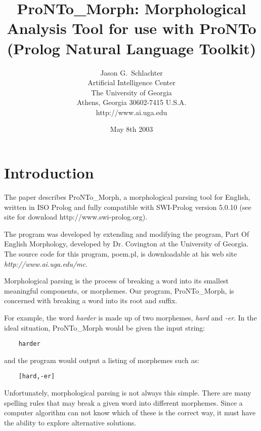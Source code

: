 \title{ProNTo\_Morph: Morphological Analysis Tool for use with ProNTo (Prolog Natural Language Toolkit)}
\author{Jason G.\ Schlachter\\
        Artificial Intelligence Center\\
        The University of Georgia \\
        Athens, Georgia 30602-7415 U.S.A.\\
        http://www.ai.uga.edu \\
        }

\date{May 8th 2003}

\maketitle




\section{Introduction}

The paper describes ProNTo\_Morph, a morphological parsing tool
for English, written in ISO Prolog and fully compatible with
SWI-Prolog version 5.0.10 (see site for download
http://www.swi-prolog.org).\newline

The program was developed by extending and modifying the program,
Part Of English Morphology, developed by Dr. Covington at the
University of Georgia.  The source code for this program, poem.pl,
is downloadable at his web site
\emph{http://www.ai.uga.edu/mc}.\newline

Morphological parsing is the process of breaking a word into its
smallest meaningful components, or morphemes. Our program,
ProNTo\_Morph, is concerned with breaking a word into its root and
suffix.\newline

For example, the word \emph{harder} is made up of two morphemes,
\emph{hard} and \emph{-er}.  In the ideal situation, ProNTo\_Morph
would be given the input string:
    \begin{verbatim}
    harder
    \end{verbatim}
and the program would output a listing of morphemes such as:
    \begin{verbatim}
    [hard,-er]
    \end{verbatim}

Unfortunately, morphological parsing is not always this simple.
There are many spelling rules that may break a given word into
different morphemes. Since a computer algorithm can not know which
of these is the correct way, it must have the ability to explore
alternative solutions.\newline

